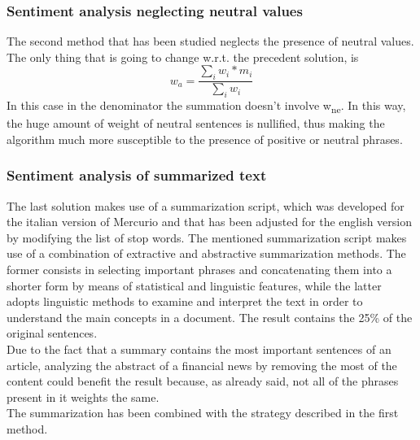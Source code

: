 \subsubsection{Sentiment analysis neglecting neutral values}

The second method that has been studied neglects the presence of neutral values. The only thing that is going to change w.r.t. the precedent solution, is 
\begin{equation}
w_a = \frac{\sum\limits_{i} w_i * m_i}{\sum\limits_{i} w_i} 
\end{equation}
In this case in the denominator the summation doesn't involve w\textsubscript{ne}. In this way, the huge amount of weight of neutral sentences is nullified, thus making the algorithm much more susceptible to the presence of positive or neutral phrases.\\

\subsubsection{Sentiment analysis of summarized text}
The last solution makes use of a summarization script, which was developed for the italian version of Mercurio and that has been adjusted for the english version by modifying the list of stop words. The mentioned summarization script makes use of a combination of extractive and abstractive summarization methods. The former consists in selecting important phrases and concatenating them into a shorter form by means of statistical and linguistic features, while the latter adopts linguistic methods to examine and interpret the text in order to understand the main concepts in a document. The result contains the 25\% of the original sentences. \\
Due to the fact that a summary contains the most important sentences of an article, analyzing the abstract of a financial news by removing the most of the content could benefit the result because, as already said, not all of the phrases present in it weights the same. \\
The summarization has been combined with the strategy described in the first method. 

